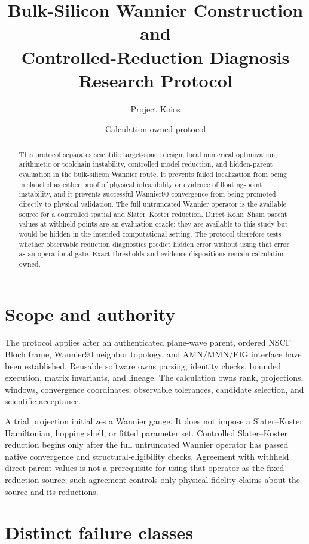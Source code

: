 \documentclass[11pt]{article}
\title{Bulk-Silicon Wannier Construction and\\Controlled-Reduction Diagnosis Research Protocol}
\author{Project Koios}
\date{Calculation-owned protocol}
\begin{document}
\maketitle

\begin{abstract}
This protocol separates scientific target-space design, local numerical optimization,
arithmetic or toolchain instability, controlled model reduction, and hidden-parent
evaluation in the bulk-silicon Wannier route.  It prevents failed localization from
being mislabeled as either proof of physical infeasibility or evidence of floating-point
instability, and it prevents successful Wannier90 convergence from being promoted
directly to physical validation.  The full untruncated Wannier operator is the available
source for a controlled spatial and Slater--Koster reduction.  Direct Kohn--Sham parent
values at withheld points are an evaluation oracle: they are available to this study but
would be hidden in the intended computational setting.  The protocol therefore tests
whether observable reduction diagnostics predict hidden error without using that error
as an operational gate.  Exact thresholds and evidence dispositions remain
calculation-owned.
\end{abstract}

\section{Scope and authority}

The protocol applies after an authenticated plane-wave parent, ordered NSCF Bloch frame,
Wannier90 neighbor topology, and AMN/MMN/EIG interface have been established.  Reusable
software owns parsing, identity checks, bounded execution, matrix invariants, and lineage.
The calculation owns rank, projections, windows, convergence coordinates, observable
tolerances, candidate selection, and scientific acceptance.

A trial projection initializes a Wannier gauge.  It does not impose a Slater--Koster
Hamiltonian, hopping shell, or fitted parameter set.  Controlled Slater--Koster
reduction begins only after the full untruncated Wannier operator has passed native
convergence and structural-eligibility checks.  Agreement with withheld direct-parent
values is not a prerequisite for using that operator as the fixed reduction source;
such agreement controls only physical-fidelity claims about the source and its
reductions.

\section{Distinct failure classes}
\end{document}
